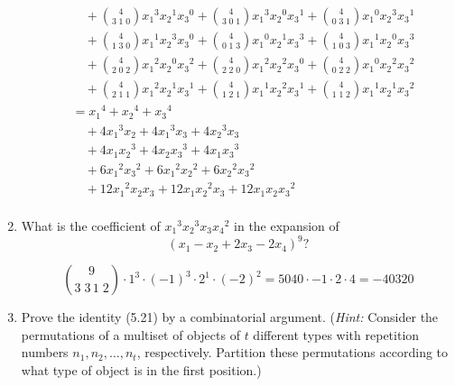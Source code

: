 \documentclass{article}
\begin{document}
\begin{enumerate}
\begin{align*}
  &\quad+\binom{4}{3\;1\;0}{x_1}^3{x_2}^1{x_3}^0
  +\binom{4}{3\;0\;1}{x_1}^3{x_2}^0{x_3}^1
  +\binom{4}{0\;3\;1}{x_1}^0{x_2}^3{x_3}^1\\
  &\quad+\binom{4}{1\;3\;0}{x_1}^1{x_2}^3{x_3}^0
  +\binom{4}{0\;1\;3}{x_1}^0{x_2}^1{x_3}^3
  +\binom{4}{1\;0\;3}{x_1}^1{x_2}^0{x_3}^3\\
  &\quad+\binom{4}{2\;0\;2}{x_1}^2{x_2}^0{x_3}^2
  +\binom{4}{2\;2\;0}{x_1}^2{x_2}^2{x_3}^0
  +\binom{4}{0\;2\;2}{x_1}^0{x_2}^2{x_3}^2\\
  &\quad+\binom{4}{2\;1\;1}{x_1}^2{x_2}^1{x_3}^1
  +\binom{4}{1\;2\;1}{x_1}^1{x_2}^2{x_3}^1
  +\binom{4}{1\;1\;2}{x_1}^1{x_2}^1{x_3}^2\\
  &={x_1}^4+{x_2}^4+{x_3}^4\\
  &\quad+4{x_1}^3{x_2}+4{x_1}^3{x_3}+4{x_2}^3{x_3}\\
  &\quad+4{x_1}{x_2}^3+4{x_2}{x_3}^3+4{x_1}{x_3}^3\\
  &\quad+6{x_1}^2{x_3}^2+6{x_1}^2{x_2}^2+6{x_2}^2{x_3}^2\\
  &\quad+12{x_1}^2{x_2}{x_3}+12{x_1}{x_2}^2{x_3}+12{x_1}{x_2}{x_3}^2\\
\end{align*}
\setcounter{enumi}{39}\item
What is the coefficient of ${x_1}^3{x_2}^3x_3{x_4}^2$ in the expansion of
\[(x_1-x_2+2x_3-2x_4)^{9}?\]

\[\binom{9}{3\;3\,1\;2}\cdot1^3\cdot(-1)^3\cdot2^1\cdot(-2)^2=5040\cdot -1\cdot2\cdot4=-40320\]

\setcounter{enumi}{41}\item
Prove the identity (5.21) by a combinatorial argument. (\emph{Hint:} Consider the permutations of a multiset of objects of $t$ different types with repetition numbers $n_1,n_2,\dots,n_t$, respectively. Partition these permutations according to what type of object is in the first position.)
\end{enumerate}
\end{document}
